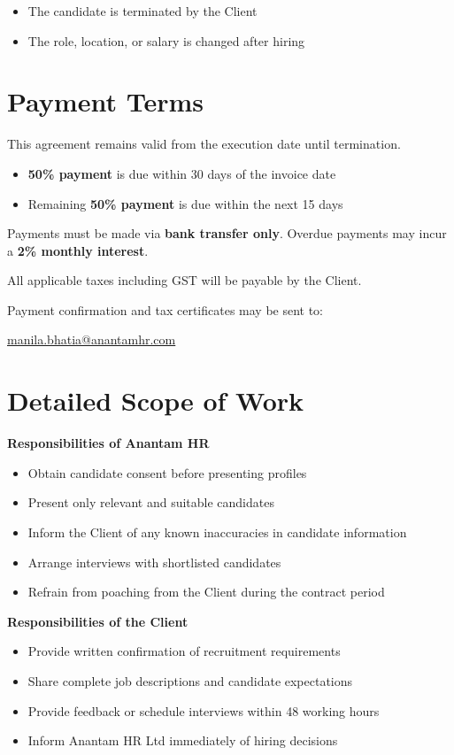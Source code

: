 \documentclass[12pt]{article}
\begin{document}
\begin{itemize}
\item The candidate is terminated by the Client
\item The role, location, or salary is changed after hiring
\end{itemize}

\section{Payment Terms}

This agreement remains valid from the execution date until termination.

\begin{itemize}
\item \textbf{50\% payment} is due within 30 days of the invoice date
\item Remaining \textbf{50\% payment} is due within the next 15 days
\end{itemize}

Payments must be made via \textbf{bank transfer only}. Overdue payments may incur a \textbf{2\% monthly interest}.

All applicable taxes including GST will be payable by the Client.

Payment confirmation and tax certificates may be sent to:

\href{mailto:manila.bhatia@anantamhr.com}{manila.bhatia@anantamhr.com}

\section{Detailed Scope of Work}

\textbf{Responsibilities of Anantam HR}

\begin{itemize}
\item Obtain candidate consent before presenting profiles
\item Present only relevant and suitable candidates
\item Inform the Client of any known inaccuracies in candidate information
\item Arrange interviews with shortlisted candidates
\item Refrain from poaching from the Client during the contract period
\end{itemize}

\textbf{Responsibilities of the Client}

\begin{itemize}
\item Provide written confirmation of recruitment requirements
\item Share complete job descriptions and candidate expectations
\item Provide feedback or schedule interviews within 48 working hours
\item Inform Anantam HR Ltd immediately of hiring decisions
\end{itemize}
\end{document}
